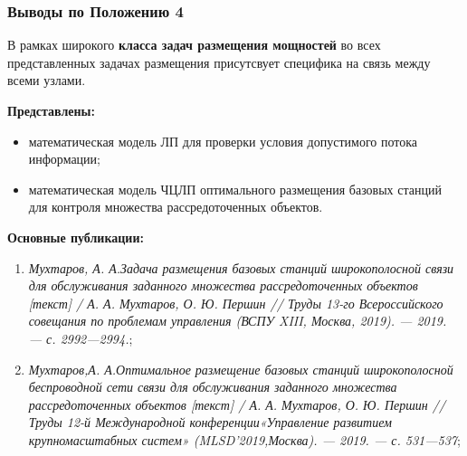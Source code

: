 \begin{frame}
    \frametitle{Выводы по Положению 4}
    \fontsize{8pt}{7.2}\selectfont

    В рамках широкого \textbf{класса задач размещения мощностей} во всех представленных задачах размещения присутсвует специфика на связь между всеми узлами. 
    \bigskip

    \textbf{Представлены:}
    \begin{itemize}
        \item математическая модель ЛП для проверки условия допустимого потока информации;
        \item математическая модель ЧЦЛП оптимального размещения базовых станций для контроля множества рассредоточенных объектов.
    \end{itemize}

    \bigskip
    \textbf{Основные публикации:}
    \begin{minipage}[c]{1\linewidth}
        \fontsize{6pt}{7.2}\selectfont
        \begin{enumerate}
            \item \textit{Мухтаров, А. А.Задача размещения базовых станций широкопо­лосной связи для обслуживания заданного множества рассредото­ченных объектов [текст] / А. А. Мухтаров, О. Ю. Першин // Труды 13-го Всероссийского совещания по проблемам управления (ВСПУ XIII, Москва, 2019). — 2019. — с. 2992—2994.};
            
            \item \textit{Мухтаров,А. А.Оптимальное размещение базовых станций широ­кополосной беспроводной сети связи для обслуживания заданного множества рассредоточенных объектов [текст] / А. А. Мухта­ров, О. Ю. Першин // Труды 12-й Международной конференции«Управление развитием крупномасштабных систем» (MLSD’2019,Москва). — 2019. — с. 531—537};
            
        \end{enumerate}
    \end{minipage}

\end{frame}


